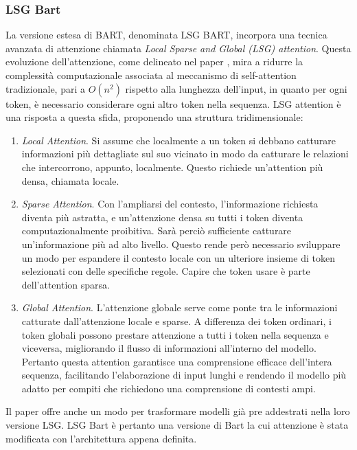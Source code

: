 \documentclass[12pt,a4paper,twoside,openright]{book}
\begin{document}
\subsubsection{LSG Bart}
La versione estesa di BART, denominata LSG BART, incorpora una tecnica avanzata di attenzione chiamata \emph{Local Sparse and Global (LSG) attention}. Questa evoluzione dell'attenzione, come delineato nel paper \cite{condevaux2022lsg}, mira a ridurre la complessità computazionale associata al meccanismo di self-attention tradizionale, pari a $O(n^2)$ rispetto alla lunghezza dell'input, in quanto per ogni token, è necessario considerare ogni altro token nella sequenza. LSG attention è una risposta a questa sfida, proponendo una struttura tridimensionale:

\begin{enumerate}
    \item \emph{Local Attention}. Si assume che localmente a un token si debbano catturare informazioni più dettagliate sul suo vicinato in modo da catturare le relazioni che intercorrono, appunto, localmente. Questo richiede un'attention più densa, chiamata locale.
    \item \emph{Sparse Attention}. Con l'ampliarsi del contesto, l'informazione richiesta diventa più astratta, e un'attenzione densa su tutti i token diventa computazionalmente proibitiva. Sarà perciò sufficiente catturare un'informazione più ad alto livello. Questo rende però necessario sviluppare un modo per espandere il contesto locale con un ulteriore insieme di token selezionati con delle specifiche regole. Capire che token usare è parte dell'attention sparsa.
    \item \emph{Global Attention}. L'attenzione globale serve come ponte tra le informazioni catturate dall'attenzione locale e sparse. A differenza dei token ordinari, i token globali possono prestare attenzione a tutti i token nella sequenza e viceversa, migliorando il flusso di informazioni all'interno del modello.
    Pertanto questa attention garantisce una comprensione efficace dell'intera sequenza, facilitando l'elaborazione di input lunghi e rendendo il modello più adatto per compiti che richiedono una comprensione di contesti ampi.
\end{enumerate}

Il paper offre anche un modo per trasformare modelli già pre addestrati nella loro versione LSG. LSG Bart è pertanto una versione di Bart la cui attenzione è stata modificata con l'architettura appena definita.
\end{document}
